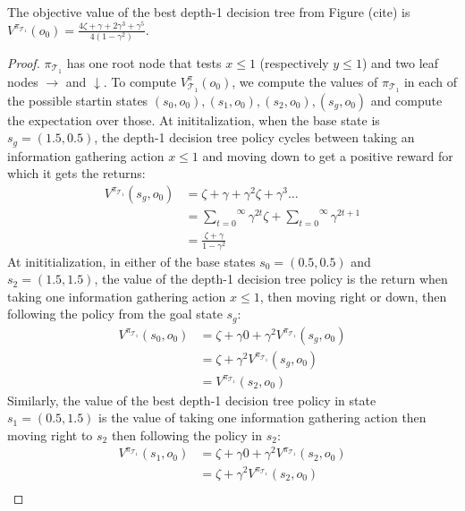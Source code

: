 \begin{proposition} The objective value of the best depth-1 decision tree from Figure (cite) is $V^{\pi_{\mathcal{T}_1}}(o_0) = \frac{4\zeta + \gamma + 2\gamma^3 + \gamma^5}{4(1-\gamma^2)}$.
\end{proposition}

\begin{proof} $\pi_{\mathcal{T}_1}$ has one root node that tests $x\leq1$ (respectively $y\leq1$) and two leaf nodes $\rightarrow$ and $\downarrow$. 
To compute $V^\pi_{\mathcal{T}_1}(o_0)$, we compute the values of $\pi_{\mathcal{T}_1}$ in each of the possible startin states $(s_0, o_0), (s_1, o_0), (s_2, o_0), (s_g, o_0)$ and compute the expectation over those. 
At inititalization, when the base state is $s_g = (1.5, 0.5)$, the depth-1 decision tree policy cycles between taking an information gathering action $x\leq1$ and moving down to get a positive reward for which it gets the returns:
\begin{align*}
    V^{\pi_{\mathcal{T}_1}} (s_g, o_0) &= \zeta + \gamma + \gamma^2 \zeta + \gamma^3 \dots \\
    &= \overset{\infty}{\underset{t=0}\sum} \gamma^{2t} \zeta + \overset{\infty}{\underset{t=0}\sum} \gamma^{2t+1} \\
    &= \frac{\zeta + \gamma}{1 - \gamma^2}
\end{align*}
At inititialization, in either of the base states $s_0=(0.5,0.5)$ and $s_2=(1.5, 1.5)$, the value of the depth-1 decision tree policy is the return when taking one information gathering action $x\leq1$, then moving right or down, then following the policy from the goal state $s_g$:
\begin{align*}
    V^{\pi_{\mathcal{T}_1}} (s_0, o_0) &= \zeta + \gamma 0 + \gamma^2 V^{\pi_{\mathcal{T}_1}} (s_g, o_0) \\
    &= \zeta + \gamma^2 V^{\pi_{\mathcal{T}_1}} (s_g, o_0) \\
    &= V^{\pi_{\mathcal{T}_1}} (s_2, o_0)
\end{align*}
Similarly, the value of the best depth-1 decision tree policy in state $s_1=(0.5,1.5)$ is the value of taking one information gathering action then moving right to $s_2$ then following the policy in $s_2$:
\begin{align*}
    V^{\pi_{\mathcal{T}_1}} (s_1, o_0) &= \zeta + \gamma 0 + \gamma^2 V^{\pi_{\mathcal{T}_1}} (s_2, o_0) \\
    &= \zeta + \gamma^2 V^{\pi_{\mathcal{T}_1}} (s_2, o_0) \\

\end{align*}
\end{proof}
